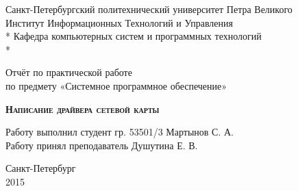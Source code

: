 \begin{titlepage}
\thispagestyle{empty}

\begin{center}
Санкт-Петербургский политехнический университет Петра Великого\\
Институт Информационных Технологий и Управления \\*
Кафедра компьютерных систем и программных технологий \\*
\hrulefill
\end{center}

\vspace{15em}

\begin{center}
\Large Отчёт по практической работе\\по предмету «Системное программное обеспечение» \\
\end{center}

\vspace{1em}

\begin{center}
\textsc{\textbf{Написание драйвера сетевой карты}}
\end{center}

\vspace{20em}

\begin{flushleft}
Работу выполнил студент гр. 53501/3 \hrulefill Мартынов С. А. \\
\vspace{1.5em}
Работу принял преподаватель \hrulefill Душутина Е. В. \\
\end{flushleft}

\vspace{\fill}

\begin{center}
Санкт-Петербург \\
2015
\end{center}

\end{titlepage}
\setcounter{page}{2}